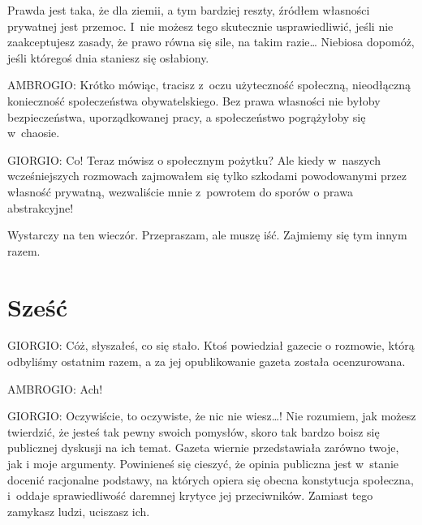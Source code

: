 \documentclass[oneside,polish,11pt,sfheadings]{mwbk}
\begin{document}
 
Prawda jest taka, że  dla ziemii, a tym bardziej reszty, źródłem własności prywatnej jest przemoc. I~nie
możesz tego skutecznie usprawiedliwić, jeśli nie zaakceptujesz zasady, że prawo równa się sile, na takim razie\ldots
Niebiosa dopomóż, jeśli któregoś dnia staniesz się osłabiony. 




 
\noindent AMBROGIO: Krótko mówiąc, tracisz z~oczu użyteczność społeczną, nieodłączną konieczność społeczeństwa obywatelskiego. Bez
prawa własności nie byłoby bezpieczeństwa, uporządkowanej pracy, a społeczeństwo pogrążyłoby się w~chaosie. 




 
\noindent GIORGIO: Co! Teraz mówisz o społecznym pożytku? Ale kiedy w~naszych wcześniejszych rozmowach zajmowałem się tylko
szkodami powodowanymi przez własność prywatną, wezwaliście mnie z~powrotem do sporów o prawa abstrakcyjne! 

 
Wystarczy na ten wieczór. Przepraszam, ale muszę iść. Zajmiemy się tym innym razem. 










\chapter*{Sześć}



 
\noindent GIORGIO: Cóż, słyszałeś, co się stało. Ktoś powiedział gazecie o rozmowie, którą odbyliśmy ostatnim razem, a za jej
opublikowanie gazeta została ocenzurowana. 




 
\noindent AMBROGIO: Ach! 




 
\noindent GIORGIO: Oczywiście, to oczywiste, że nic nie wiesz\ldots! Nie rozumiem, jak możesz twierdzić, że jesteś tak pewny swoich
pomysłów, skoro tak bardzo boisz się publicznej dyskusji na ich temat. Gazeta wiernie przedstawiała zarówno twoje, jak
i moje argumenty. Powinieneś się cieszyć, że opinia publiczna jest w~stanie docenić racjonalne podstawy, na których
opiera się obecna konstytucja społeczna, i~oddaje sprawiedliwość daremnej krytyce jej przeciwników. Zamiast tego
zamykasz ludzi, uciszasz ich. 
\end{document}
